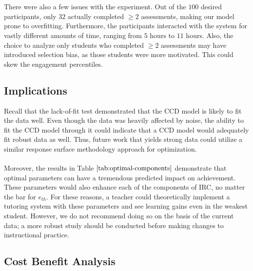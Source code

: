 \documentclass[12pt]{article}
\begin{document}
\\\\
There were also a few issues with the experiment. Out of the $100$ desired participants, only $32$ actually completed $\ge 2$ assessments, making our model prone to overfitting. Furthermore, the participants interacted with the system for vastly different amounts of time, ranging from $5$ hours to $11$ hours. Also, the choice to analyze only students who completed $\ge 2$ assessments may have introduced selection bias, as those students were more motivated. This could skew the engagement percentiles.

\subsection{Implications}

Recall that the lack-of-fit test demonstrated that the CCD model is likely to fit the data well. Even though the data was heavily affected by noise, the ability to fit the CCD model through it could indicate that a CCD model would adequately fit robust data as well. Thus, future work that yields strong data could utilize a similar response surface methodology approach for optimization.
\\\\
Moreover, the results in Table $\ref{tab:optimal-components}$ demonstrate that optimal parameters can have a tremendous predicted impact on achievement. These parameters would also enhance each of the components of IRC, no matter the bar for $e_{th}$. For these reasons, a teacher could theoretically implement a tutoring system with these parameters and see learning gains even in the weakest student. However, we do not recommend doing so on the basis of the current data; a more robust study should be conducted before making changes to instructional practice.

\subsection{Cost Benefit Analysis}
\end{document}
